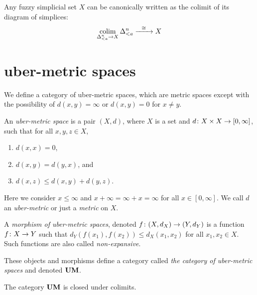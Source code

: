\documentclass{amsart}
\def\UM{{\bf UM}}
\begin{document}
Any fuzzy simplicial set $X$ can be canonically written as the colimit of its diagram of simplices: $$\mathop{\textnormal{colim}}_{\Delta^n_{<a}\rightarrow X}\Delta^n_{<a}\xrightarrow{\ \ \cong\ \ } X$$


\section{uber-metric spaces}

We define a category of uber-metric spaces, which are metric spaces except with the possibility of $d(x,y)=\infty$ or $d(x,y)=0$ for $x\neq y$.

\begin{definition}

An {\em uber-metric space} is a pair $(X,d)$, where $X$ is a set and $d\colon X\times X\rightarrow [0,\infty]$, such that for all $x,y,z\in X$, \begin{enumerate}\item $d(x,x)=0$,\item $d(x,y)=d(y,x)$, and\item $d(x,z)\leq d(x,y)+d(y,z)$.\end{enumerate}  Here we consider $x\leq\infty$ and $x+\infty=\infty+x=\infty$ for all $x\in [0,\infty]$.  We call $d$ an {\em uber-metric} or just a {\em metric} on $X$.

A {\em morphism of uber-metric spaces}, denoted $f\colon (X,d_X)\rightarrow (Y,d_Y)$ is a function $f\colon X\rightarrow Y$ such that $d_Y(f(x_1),f(x_2))\leq d_X(x_1,x_2)$ for all $x_1,x_2\in X$.  Such functions are also called {\em non-expansive}.

These objects and morphisms define a category called {\em the category of uber-metric spaces} and denoted $\UM$.

\end{definition}

\begin{lemma}

The category $\UM$ is closed under colimits.

\end{lemma}
\end{document}
